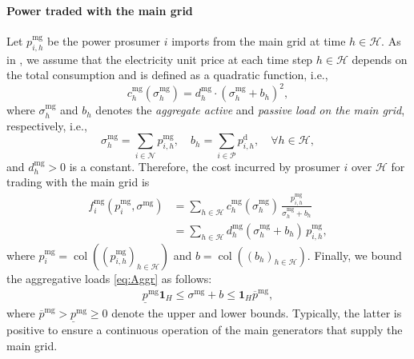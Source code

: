 \documentclass{IEEEtran}  %
\newcommand{\mc}{\mathcal}
\newcommand{\col}{\operatorname{col}}
\newcommand{\0}{\mathbf{0}}
\newcommand{\1}{\mathbf{1}}
\begin{document}
\smallskip
\paragraph*{Power traded with the main grid} Let $p_{i,h}^{\mathrm{mg}}$ be the power prosumer $i$ imports from the main grid at time $h \in \mc H$. As in \cite{atzeni2013}, we assume that the electricity unit price at each time step $h \in \mc H	$ depends on the total consumption and is defined as a quadratic function, i.e.,
\begin{equation}
c_h^{\mathrm{mg}}(\sigma^{\textrm{mg}}_h)= d_h^{\mathrm{mg}}\cdot {\left(\sigma^{\textrm{mg}}_h + b_h \right)}^2,
\end{equation}
where $\sigma^{\textrm{mg}}_h$ and $b_h$ denotes the \textit{aggregate active} and \textit{passive} \textit{load on the main grid}, respectively, i.e., 
\begin{equation} \label{eq:Aggr}
\sigma^{\textrm{mg}}_h = \sum_{i\in\mathcal{N}} p_{i,h}^{\mathrm{mg}},
\quad
b_h =\sum_{i\in \mathcal P}p_{i,h}^{\mathrm{d}},
 \quad \forall h \in \mathcal H,
\end{equation} 
and $d_h^{\mathrm{mg}} > 0$ is a constant.
Therefore, the cost incurred by prosumer $i$ over $\mc H$ for trading with the main grid is
\begin{equation}
\begin{aligned} \textstyle
f_{i}^{\mathrm{mg}}\left( p_{i}^{\mathrm{mg}},\sigma^{\textrm{mg}} \right) &= \sum_{h\in \mc H}c_h^{\mathrm{mg}}(\sigma^{\textrm{mg}}_h) \, \frac{p_{i,h}^{\mathrm{mg}}}{\sigma_h^{\textrm{mg}} + b_h}\\
&= \sum_{h\in \mc H}  d_h^{\mathrm{mg}}(\sigma^{\textrm{mg}}_h+b_h) \, p_{i,h}^{\mathrm{mg}},
\label{eq:f_mg}
\end{aligned}
\end{equation}
where $p_{i}^{\mathrm{mg}} = \col((p_{i,h}^{\mathrm{mg}})_{h\in\mc H})$ and $b =\col((b_h)_{h\in\mc H})$. 
%
Finally, we bound the aggregative loads \eqref{eq:Aggr} as follows:
\begin{align}
\underline{p}^{\mathrm{mg}} \1_H \leq \sigma^{\textrm{mg}} + b  \leq \1_H \overline{p}^{\mathrm{mg}}  , \label{eq:p_mg_bound}
\end{align}
where $\overline{p}^{\mathrm{mg}}>\underline{p}^{\mathrm{mg}} \geq 0$ denote the upper and lower bounds. Typically, the latter is  positive to ensure a continuous operation of the main generators that supply the main grid.
\end{document}
